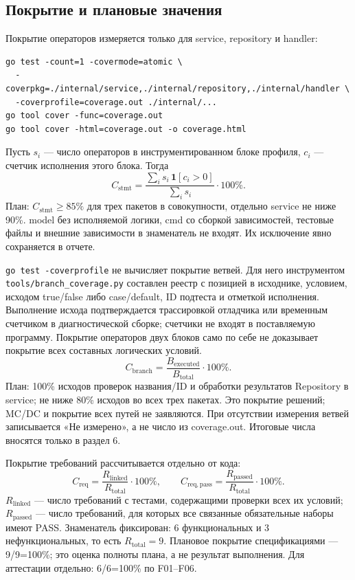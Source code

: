 \documentclass[12pt,a4paper]{extarticle}
\newcommand{\code}[1]{\nolinkurl{#1}}
\begin{document}
\subsection{Покрытие и плановые значения}\label{sec:coverage}
Покрытие операторов измеряется только для service, repository и handler:
\begin{lstlisting}[language={}]
go test -count=1 -covermode=atomic \
  -coverpkg=./internal/service,./internal/repository,./internal/handler \
  -coverprofile=coverage.out ./internal/...
go tool cover -func=coverage.out
go tool cover -html=coverage.out -o coverage.html
\end{lstlisting}

Пусть $s_i$ --- число операторов в инструментированном блоке профиля,
$c_i$ --- счетчик исполнения этого блока. Тогда
\[
 C_{\mathrm{stmt}}=
 \frac{\sum_i s_i\,\mathbf{1}[c_i>0]}{\sum_i s_i}\cdot100\%.
\]
План: $C_{\mathrm{stmt}}\geq85\%$ для трех пакетов в совокупности,
отдельно service не ниже 90\%. model без исполняемой логики,
cmd со сборкой зависимостей, тестовые файлы и внешние зависимости
в знаменатель не входят. Их исключение явно сохраняется в отчете.

\code{go test -coverprofile} не вычисляет покрытие ветвей.
Для него инструментом \code{tools/branch_coverage.py} составлен реестр с позицией в исходнике,
условием, исходом true/false либо case/default, ID подтеста и отметкой
исполнения. Выполнение исхода подтверждается трассировкой отладчика
или временным счетчиком в диагностической сборке; счетчики не входят
в поставляемую программу. Покрытие операторов двух блоков само по себе
не доказывает покрытие всех составных логических условий.
\[
 C_{\mathrm{branch}}=
 \frac{B_{\mathrm{executed}}}{B_{\mathrm{total}}}\cdot100\%.
\]
План: 100\% исходов проверок названия/ID и обработки результатов
Repository в service; не ниже 80\% исходов во всех трех пакетах.
Это покрытие решений; MC/DC и покрытие всех путей не заявляются.
При отсутствии измерения ветвей записывается «Не измерено»,
а не число из coverage.out. Итоговые числа вносятся только в раздел 6.

Покрытие требований рассчитывается отдельно от кода:
\[
 C_{\mathrm{req}}=\frac{R_{\mathrm{linked}}}{R_{\mathrm{total}}}\cdot100\%,
 \qquad
 C_{\mathrm{req,pass}}=\frac{R_{\mathrm{passed}}}{R_{\mathrm{total}}}\cdot100\%.
\]
$R_{\mathrm{linked}}$ --- число требований с тестами, содержащими
проверки всех их условий; $R_{\mathrm{passed}}$ --- число требований,
для которых все связанные обязательные наборы имеют PASS.
Знаменатель фиксирован: 6 функциональных и 3 нефункциональных,
то есть $R_{\mathrm{total}}=9$. Плановое покрытие спецификациями ---
9/9=100\%; это оценка полноты плана, а не результат выполнения.
Для аттестации отдельно: 6/6=100\% по F01--F06.
\end{document}
